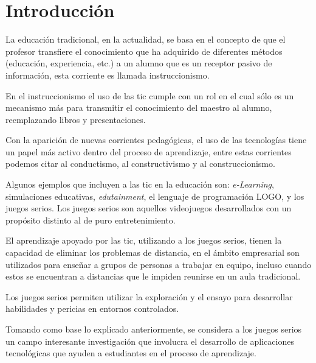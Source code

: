 \chapter{Introducción}
\label{chap:introduccion}




La educación tradicional, en la actualidad, se basa en el concepto de que el
profesor transfiere el conocimiento que ha adquirido de diferentes métodos
(educación, experiencia, etc.) a un alumno que es un receptor pasivo de
información, esta corriente es llamada
instruccionismo\cite{laptop:instructionism}. 

En el instruccionismo el uso de las \Gls{tic} cumple con un rol en el cual
sólo es un mecanismo más para transmitir el conocimiento del maestro al alumno,
reemplazando libros y presentaciones. 

Con la aparición de nuevas corrientes pedagógicas, el uso de las tecnologías
tiene un papel más activo dentro del proceso de aprendizaje, entre estas
corrientes podemos citar al conductismo, al constructivismo y al
construccionismo. 


Algunos ejemplos que incluyen a las \gls{tic} en la educación son:
\emph{e-Learning}, simulaciones educativas, \emph{edutainment}, el lenguaje de
programación LOGO, y los juegos serios. Los juegos serios son aquellos
videojuegos desarrollados con un propósito distinto al de puro entretenimiento.

El aprendizaje apoyado por las \Gls{tic}, utilizando a los juegos serios, tienen
la capacidad de eliminar los problemas de distancia, en el ámbito empresarial
son utilizados para enseñar a grupos de personas a trabajar en equipo, incluso
cuando estos se encuentran a distancias que le impiden reunirse en un aula
tradicional\cite{guenaga2013serious}. 

Los juegos serios permiten utilizar la exploración y el ensayo para desarrollar
habilidades y pericias en entornos
controlados\cite{humphreys2013developing,sg:aoverview}.
   
Tomando como base lo explicado anteriormente, se considera a los juegos serios
un campo interesante investigación que involucra el desarrollo de aplicaciones
tecnológicas que ayuden a estudiantes en el proceso de aprendizaje. 

